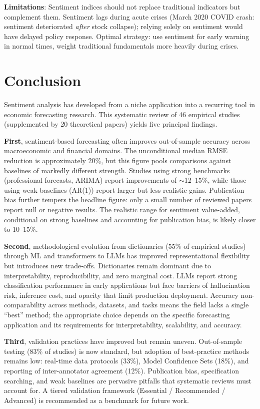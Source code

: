 \documentclass[11pt,twocolumn]{article}
\begin{document}
\textbf{Limitations}: Sentiment indices should not replace traditional indicators but complement them. Sentiment lags during acute crises (March 2020 COVID crash: sentiment deteriorated \emph{after} stock collapse); relying solely on sentiment would have delayed policy response. Optimal strategy: use sentiment for early warning in normal times, weight traditional fundamentals more heavily during crises.

\section{Conclusion}

Sentiment analysis has developed from a niche application into a recurring tool in economic forecasting research. This systematic review of 46 empirical studies (supplemented by 20 theoretical papers) yields five principal findings.

\textbf{First}, sentiment-based forecasting often improves out-of-sample accuracy across macroeconomic and financial domains. The unconditional median RMSE reduction is approximately 20\%, but this figure pools comparisons against baselines of markedly different strength. Studies using strong benchmarks (professional forecasts, ARIMA) report improvements of $\sim$12--15\%, while those using weak baselines (AR(1)) report larger but less realistic gains. Publication bias further tempers the headline figure: only a small number of reviewed papers report null or negative results. The realistic range for sentiment value-added, conditional on strong baselines and accounting for publication bias, is likely closer to 10--15\%.

\textbf{Second}, methodological evolution from dictionaries (55\% of empirical studies) through ML and transformers to LLMs has improved representational flexibility but introduces new trade-offs. Dictionaries remain dominant due to interpretability, reproducibility, and zero marginal cost. LLMs report strong classification performance in early applications but face barriers of hallucination risk, inference cost, and opacity that limit production deployment. Accuracy non-comparability across methods, datasets, and tasks means the field lacks a single ``best'' method; the appropriate choice depends on the specific forecasting application and its requirements for interpretability, scalability, and accuracy.

\textbf{Third}, validation practices have improved but remain uneven. Out-of-sample testing (83\% of studies) is now standard, but adoption of best-practice methods remains low: real-time data protocols (33\%), Model Confidence Sets (18\%), and reporting of inter-annotator agreement (12\%). Publication bias, specification searching, and weak baselines are pervasive pitfalls that systematic reviews must account for. A tiered validation framework (Essential / Recommended / Advanced) is recommended as a benchmark for future work.
\end{document}
